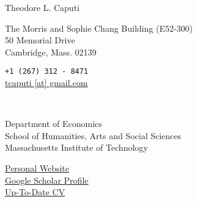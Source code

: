 \documentclass[10pt, letterpaper]{article}
\newcommand*{\img}[1]{%
    \raisebox{-.3\baselineskip}{%
        \texttt{[image: \#1]}%
    }%
}
\begin{document}
\large
{\huge Theodore L. Caputi}\\[.55cm]
%
%


\noindent{\tabcolsep}\begin{minipage}{0.65\linewidth}
The Morris and Sophie Chang Building (E52-300)\\
50 Memorial Drive\\
Cambridge, Mass. 02139 %
\end{minipage}
\begin{minipage}{0.35\linewidth}
\texttt{+1 (267) 312 - 8471}\\
\href{mailto:tcaputi@g.harvard.edu}{tcaputi [at] gmail.com}\\
\end{minipage}\\[.2cm]



\noindent{\tabcolsep}\begin{minipage}{0.65\linewidth}
Department of Economics\\
School of Humanities, Arts and Social Sciences\\
Massachusetts Institute of Technology
\end{minipage}
\begin{minipage}{0.35\linewidth}
\href{http://www.TheodoreCaputi.com}{Personal Website}\\
\href{http://goo.gl/fVRxR4}{Google Scholar Profile}\\
\href{https://www.theodorecaputi.com/files/TheodoreCaputiCV.pdf}{Up-To-Date CV}
\end{minipage}\\[.2cm]
\end{document}
